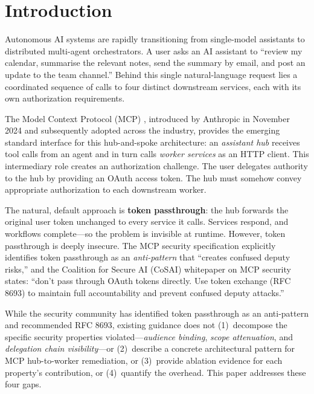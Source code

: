 \documentclass[journal]{IEEEtran}
\theoremstyle{definition}
\begin{document}
\section{Introduction}
\label{sec:introduction}

Autonomous AI systems are rapidly transitioning from single-model assistants to
distributed multi-agent orchestrators. A user asks an AI assistant to
``review my calendar, summarise the relevant notes, send the summary by email, and
post an update to the team channel.'' Behind this single natural-language request
lies a coordinated sequence of calls to four distinct downstream services, each
with its own authorization requirements.

The Model Context Protocol (MCP) \cite{mcp_spec}, introduced by Anthropic in
November 2024 and subsequently adopted across the industry, provides the emerging
standard interface for this hub-and-spoke architecture: an \textit{assistant hub}
receives tool calls from an agent and in turn calls \textit{worker services} as
an HTTP client. This intermediary role creates an authorization challenge. The
user delegates authority to the hub by providing an OAuth access token. The hub
must somehow convey appropriate authorization to each downstream worker.

The natural, default approach is \textbf{token passthrough}: the hub forwards
the original user token unchanged to every service it calls. Services respond,
and workflows complete---so the problem is invisible at runtime. However,
token passthrough is deeply insecure. The MCP security specification \cite{mcp_security} explicitly
identifies token passthrough as an \textit{anti-pattern} that ``creates confused
deputy risks,'' and the Coalition for Secure AI (CoSAI) whitepaper on MCP
security \cite{cosai_mcp} states: ``don't pass through OAuth tokens directly.
Use token exchange (RFC 8693) to maintain full accountability and prevent confused
deputy attacks.''

While the security community has identified token passthrough as an anti-pattern
and recommended RFC 8693, existing guidance does not (1)~decompose the specific
security properties violated---\textit{audience binding}, \textit{scope
attenuation}, and \textit{delegation chain visibility}---or (2)~describe a
concrete architectural pattern for MCP hub-to-worker remediation, or
(3)~provide ablation evidence for each property's contribution, or
(4)~quantify the overhead. This paper addresses these four gaps.
\end{document}
